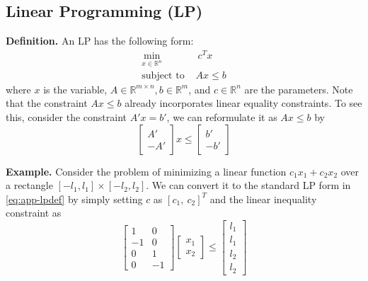 \documentclass[
]{book}
\theoremstyle{definition}
\theoremstyle{definition}
\theoremstyle{definition}
\theoremstyle{definition}
\theoremstyle{remark}
\begin{document}
\subsection{Linear Programming (LP)}\label{linear-programming-lp}

\textbf{Definition.} An LP has the following form:
\begin{equation}
   \label{eq:app-lpdef}
   \begin{aligned}
      \min_{x \in \mathbb{R}^n} & \ c^T x \\
      \text{subject to } & A x \le b  
   \end{aligned}
\end{equation}
where \(x\) is the variable, \(A \in \mathbb{R}^{m\times n}, b \in \mathbb{R}^m\), and \(c \in \mathbb{R}^n\) are the parameters. Note that the constraint \(A x \le b\) already incorporates linear equality constraints. To see this, consider the constraint \(A' x = b'\), we can reformulate it as \(A x \le b\) by
\begin{equation*}
   \begin{bmatrix}
      A' \\ -A'
   \end{bmatrix} x \le \begin{bmatrix}
      b' \\ -b'
   \end{bmatrix}
\end{equation*}

\textbf{Example.} Consider the problem of minimizing a linear function \(c_1 x_1 + c_2 x_2\) over a rectangle \([-l_1, l_1] \times [-l_2, l_2]\). We can convert it to the standard LP form in \eqref{eq:app-lpdef} by simply setting \(c\) as \([c_1, \ c_2]^T\) and the linear inequality constraint as
\begin{equation*}
   \begin{bmatrix}
      1 & 0 \\ -1 & 0 \\ 0 & 1 \\ 0 & -1
   \end{bmatrix} \begin{bmatrix}
      x_1 \\ x_2
   \end{bmatrix} \le \begin{bmatrix}
      l_1 \\ l_1 \\ l_2 \\ l_2
   \end{bmatrix}
\end{equation*}
\end{document}
